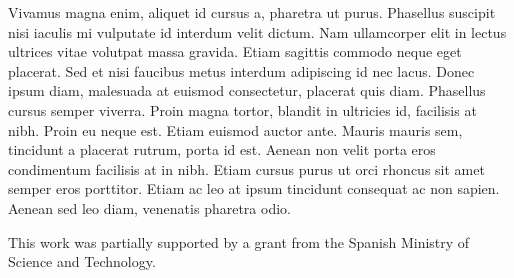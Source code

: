 \documentclass[draft,jgrga]{AGUTeX}
\begin{document}
\begin{article}
Vivamus magna enim, aliquet id cursus a, pharetra ut purus. Phasellus suscipit nisi iaculis mi vulputate id interdum velit dictum. Nam ullamcorper elit in lectus ultrices vitae volutpat massa gravida. Etiam sagittis commodo neque eget placerat. Sed et nisi faucibus metus interdum adipiscing id nec lacus. Donec ipsum diam, malesuada at euismod consectetur, placerat quis diam. Phasellus cursus semper viverra. Proin magna tortor, blandit in ultricies id, facilisis at nibh. Proin eu neque est. Etiam euismod auctor ante. Mauris mauris sem, tincidunt a placerat rutrum, porta id est. Aenean non velit porta eros condimentum facilisis at in nibh. Etiam cursus purus ut orci rhoncus sit amet semper eros porttitor. Etiam ac leo at ipsum tincidunt consequat ac non sapien. Aenean sed leo diam, venenatis pharetra odio. 


%
%
%


\begin{acknowledgments}
This work was partially supported by a grant from the Spanish Ministry of Science and Technology.
\end{acknowledgments}


\end{article}
\end{document}
